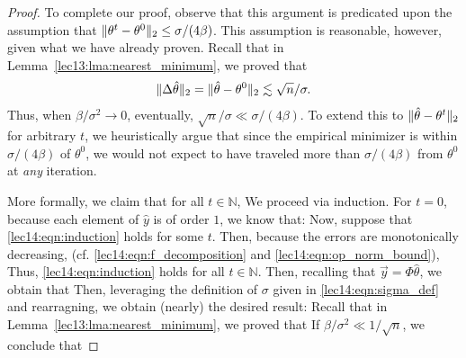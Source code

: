 \begin{proof}
To complete our proof, observe that this argument is predicated upon the assumption that $\|\theta^t - \theta^0\|_2 \leq \sigma/(4\beta)$. This assumption is reasonable, however, given what we have already proven. Recall that in Lemma~\ref{lec13:lma:nearest_minimum}, we proved that 
\begin{align}
    \|\Delta \hat{\theta}\|_2 = \|\hat{\theta} - \theta^{0}\|_2 \lesssim \sqrt{n}/\sigma.
\end{align}
Thus, when $\beta/\sigma^2 \rightarrow 0$, eventually, $\sqrt{n}/\sigma \ll \sigma/(4\beta)$. To extend this to $\|\hat{\theta} - \theta^t\|_2$ for arbitrary $t$, we heuristically argue that since the empirical minimizer is within $\sigma/(4\beta)$ of $\theta^0$, we would not expect to have traveled more than $\sigma/(4\beta)$ from $\theta^0$ at \emph{any} iteration. 

More formally, we claim that for all $t \in \mathbb{N}$, 
We proceed via induction. For $t=0$, because each element of $\hat{y}$ is of order $1$, we know that: 
Now, suppose that \eqref{lec14:eqn:induction} holds for some $t$. Then, because the errors are monotonically decreasing, (cf. \eqref{lec14:eqn:f_decomposition} and \eqref{lec14:eqn:op_norm_bound}), 
Thus, \eqref{lec14:eqn:induction} holds for all $t \in \mathbb{N}$. Then, recalling that $\vec{y} = \Phi\hat{\theta}$, we obtain that
Then, leveraging the definition of $\sigma$ given in \eqref{lec14:eqn:sigma_def} and rearragning, we obtain (nearly) the desired result:
Recall that in Lemma~\ref{lec13:lma:nearest_minimum}, we proved that 
If $\beta/\sigma^2 \ll 1/\sqrt{n}$, we conclude that
\end{proof}

